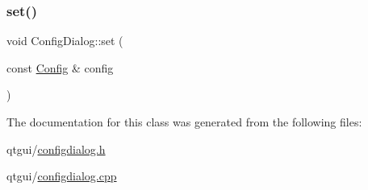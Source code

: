 \subsubsection{\texorpdfstring{set()}{set()}}
{\footnotesize\ttfamily void Config\+Dialog\+::set (\begin{DoxyParamCaption}\item[{const \mbox{\hyperlink{class_config}{Config}} \&}]{config }\end{DoxyParamCaption})}



The documentation for this class was generated from the following files\+:\begin{DoxyCompactItemize}
\item 
qtgui/\mbox{\hyperlink{configdialog_8h}{configdialog.\+h}}\item 
qtgui/\mbox{\hyperlink{configdialog_8cpp}{configdialog.\+cpp}}\end{DoxyCompactItemize}
